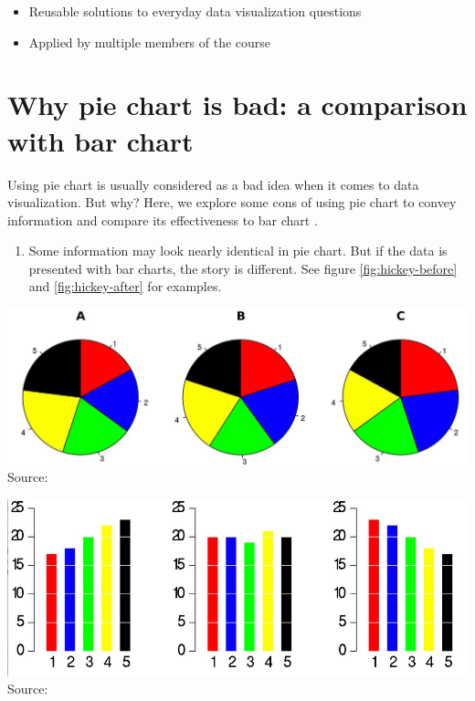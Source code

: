 \documentclass[]{book}
\providecommand{\tightlist}{%
  \setlength{\itemsep}{0pt}\setlength{\parskip}{0pt}}
\theoremstyle{definition}
\theoremstyle{definition}
\theoremstyle{definition}
\theoremstyle{remark}
\begin{document}
\begin{itemize}
\tightlist
\item
  Reusable solutions to everyday data visualization questions
\item
  Applied by multiple members of the course
\end{itemize}

\section{Why pie chart is bad: a comparison with bar
chart}\label{why-pie-chart-is-bad-a-comparison-with-bar-chart}

Using pie chart is usually considered as a bad idea when it comes to
data visualization. But why? Here, we explore some cons of using pie
chart to convey information and compare its effectiveness to bar chart
\citep{hickey-pie-worst} \citep{henry-defense-pie} \citep{quach-penny}.

\begin{enumerate}
\def\labelenumi{\arabic{enumi}.}
\tightlist
\item
  Some information may look nearly identical in pie chart. But if the
  data is presented with bar charts, the story is different. See figure
  \ref{fig:hickey-before} and \ref{fig:hickey-after} for examples.
\end{enumerate}

\includegraphics{images/hickey-before.jpg} Source:
\citep{hickey-pie-worst}

\includegraphics{images/hickey-after.jpg} Source:
\citep{hickey-pie-worst}
\end{document}
